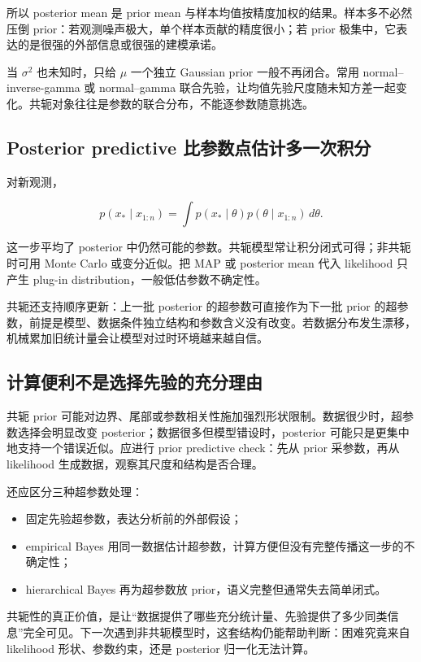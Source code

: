 所以 posterior mean 是 prior mean 与样本均值按精度加权的结果。样本多不必然压倒 prior：若观测噪声极大，单个样本贡献的精度很小；若 prior 极集中，它表达的是很强的外部信息或很强的建模承诺。

当 \(\sigma^2\) 也未知时，只给 \(\mu\) 一个独立 Gaussian prior 一般不再闭合。常用 normal--inverse-gamma 或 normal--gamma 联合先验，让均值先验尺度随未知方差一起变化。共轭对象往往是参数的联合分布，不能逐参数随意挑选。

\subsection{Posterior predictive 比参数点估计多一次积分}

对新观测，

\[
p(x_*\mid x_{1:n})
=\int
p(x_*\mid\theta)
p(\theta\mid x_{1:n})
\,d\theta.
\]

这一步平均了 posterior 中仍然可能的参数。共轭模型常让积分闭式可得；非共轭时可用 Monte Carlo 或变分近似。把 MAP 或 posterior mean 代入 likelihood 只产生 plug-in distribution，一般低估参数不确定性。

共轭还支持顺序更新：上一批 posterior 的超参数可直接作为下一批 prior 的超参数，前提是模型、数据条件独立结构和参数含义没有改变。若数据分布发生漂移，机械累加旧统计量会让模型对过时环境越来越自信。

\subsection{计算便利不是选择先验的充分理由}

共轭 prior 可能对边界、尾部或参数相关性施加强烈形状限制。数据很少时，超参数选择会明显改变 posterior；数据很多但模型错设时，posterior 可能只是更集中地支持一个错误近似。应进行 prior predictive check：先从 prior 采参数，再从 likelihood 生成数据，观察其尺度和结构是否合理。

还应区分三种超参数处理：

\begin{itemize}
\tightlist
\item 固定先验超参数，表达分析前的外部假设；
\item empirical Bayes 用同一数据估计超参数，计算方便但没有完整传播这一步的不确定性；
\item hierarchical Bayes 再为超参数放 prior，语义完整但通常失去简单闭式。
\end{itemize}

共轭性的真正价值，是让“数据提供了哪些充分统计量、先验提供了多少同类信息”完全可见。下一次遇到非共轭模型时，这套结构仍能帮助判断：困难究竟来自 likelihood 形状、参数约束，还是 posterior 归一化无法计算。
